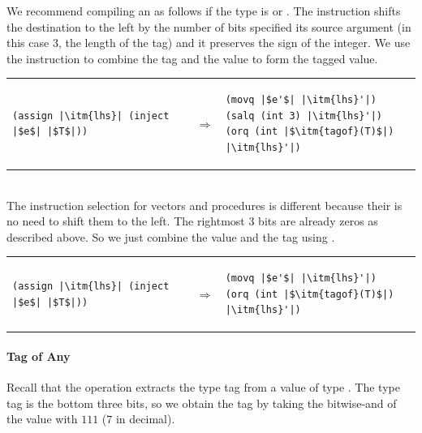\documentclass[11pt]{book}
\begin{document}
We recommend compiling an  as follows if the type is
 or .  The  instruction shifts the
destination to the left by the number of bits specified its source
argument (in this case $3$, the length of the tag) and it preserves
the sign of the integer. We use the  instruction to combine
the tag and the value to form the tagged value.  \\
\begin{tabular}{lll}
\begin{minipage}{0.4\textwidth}
\begin{lstlisting}
(assign |\itm{lhs}| (inject |$e$| |$T$|))
\end{lstlisting}
\end{minipage}
&
$\Rightarrow$
&
\begin{minipage}{0.5\textwidth}
\begin{lstlisting}
(movq |$e'$| |\itm{lhs}'|)
(salq (int 3) |\itm{lhs}'|)
(orq (int |$\itm{tagof}(T)$|) |\itm{lhs}'|)
\end{lstlisting}
\end{minipage}
\end{tabular}  \\
The instruction selection for vectors and procedures is different
because their is no need to shift them to the left. The rightmost 3
bits are already zeros as described above. So we just combine the
value and the tag using .  \\
\begin{tabular}{lll}
\begin{minipage}{0.4\textwidth}
\begin{lstlisting}
(assign |\itm{lhs}| (inject |$e$| |$T$|))
\end{lstlisting}
\end{minipage}
&
$\Rightarrow$
&
\begin{minipage}{0.5\textwidth}
\begin{lstlisting}
(movq |$e'$| |\itm{lhs}'|)
(orq (int |$\itm{tagof}(T)$|) |\itm{lhs}'|)
\end{lstlisting}
\end{minipage}
\end{tabular} 

\paragraph{Tag of Any}

Recall that the  operation extracts the type tag from
a value of type . The type tag is the bottom three bits, so
we obtain the tag by taking the bitwise-and of the value with $111$
($7$ in decimal).
\end{document}
